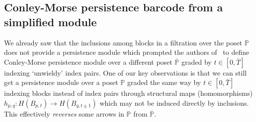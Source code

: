 \documentclass[letterpaper,11pt]{article}
\theoremstyle{plain}
\theoremstyle{definition}
\newcounter{li}
\begin{document}
\subsection{Conley-Morse persistence barcode from a simplified module}
\label{sec:construction-of-structural-map-h}
We already saw that the inclusions among blocks in a filtration over the
poset $\mathbb{P}$ does not provide a persistence module which prompted the
authors of~\cite{CMbarcodes2025} to define Conley-Morse persistence module
over a different poset $\overline{\mathbb{P}}$ graded by $t\in [0,\bar T]$ indexing `unwieldy' index pairs.
One of our key observations is that we can still get a persistence module over
a poset $\mathbb{P}$ graded the same way by $t\in [0,\bar T]$ indexing
blocks instead of index pairs through structural maps (homomorphisms)
$h_{p,q}: H(B_{p,t})\rightarrow H(B_{q,t\pm 1})$ which may not be induced directly by inclusions. 
This effectively \emph{reverses} some arrows in $\mathbb{P}$ from $\overline{\mathbb P}$.
\end{document}
